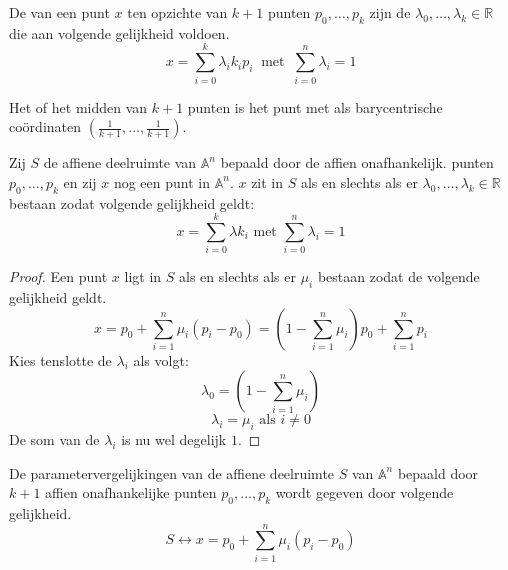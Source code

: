 \documentclass[main.tex]{subfiles}
\begin{document}
\begin{de}
  De  van een punt $x$ ten opzichte van $k+1$ punten $p_{0},\dotsc,p_{k}$ zijn de $\lambda_{0},\dotsc,\lambda_{k} \in \mathbb{R}$ die aan volgende gelijkheid voldoen.
  \[ x = \sum_{i=0}^{k}\lambda_{i} k_{i}p_{i}\ \text{ met }\ \sum_{i=0}^{n}\lambda_{i} = 1 \]
\end{de}

\begin{de}
  Het  of het midden van $k+1$ punten is het punt met als barycentrische co\"ordinaten $(\frac{1}{k+1},\dotsc,\frac{1}{k+1})$.
\end{de}


\begin{st}
  Zij $S$ de affiene deelruimte van $\mathbb{A}^{n}$ bepaald door de affien onafhankelijk. punten $p_{0},\dotsc,p_{k}$ en zij $x$ nog een punt in $\mathbb{A}^{n}$.
  $x$ zit in $S$ als en slechts als er $\lambda_{0},\dotsc,\lambda_{k} \in \mathbb{R}$ bestaan zodat volgende gelijkheid geldt:
  \[ x = \sum_{i=0}^{k}\lambda k_{i} \text{ met } \sum_{i=0}^{n}\lambda_{i} = 1\]

  \begin{proof}
    Een punt $x$ ligt in $S$ als en slechts als er $\mu_{i}$ bestaan zodat de volgende gelijkheid geldt.
    \[ x = p_{0} + \sum_{i=1}^{n}\mu_{i}(p_{i}-p_{0}) = \left(1 - \sum_{i=1}^{n}\mu_{i}\right)p_{0} + \sum_{i=1}^{n}p_{i} \]
    Kies tenslotte de $\lambda_{i}$ als volgt:
    \[ \lambda_{0} = \left(1 - \sum_{i=1}^{n}\mu_{i}\right) \]
    \[ \lambda_{i} = \mu_{i} \text{ als } i \neq 0 \]
    De som van de $\lambda_{i}$ is nu wel degelijk $1$.
  \end{proof}
\end{st}


\begin{de}
  De parametervergelijkingen van de affiene deelruimte $S$ van $\mathbb{A}^{n}$ bepaald door $k+1$ affien onafhankelijke punten $p_{0},\dotsc,p_{k}$ wordt gegeven door volgende gelijkheid.
  \[ S \leftrightarrow x = p_{0} + \sum_{i=1}^{n}\mu_{i}(p_{i}-p_{0}) \]
\end{de}
\end{document}

